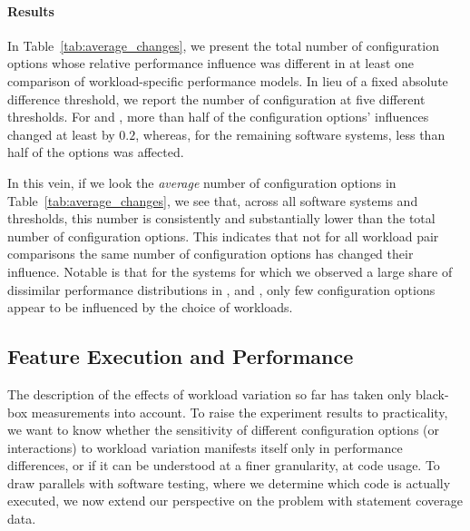 \paragraph*{Results} {\color{blue} 
In Table~\ref{tab:average_changes}, we present the total number of configuration options whose relative performance influence was different in at least one comparison of workload-specific performance models. In lieu of a fixed absolute difference threshold, we report the number of configuration at five different thresholds. For \jumper and \kanzi, more than half of the configuration options' influences changed at least by $0.2$, whereas, for the remaining software systems, less than half of the options was affected.

In this vein, if we look the \textit{average} number of configuration options in Table~\ref{tab:average_changes}, we see that, across all software systems and thresholds, this number is consistently and substantially lower than the total number of configuration options. This indicates that not for all workload pair comparisons the same number of configuration options has changed their influence. Notable is that for the systems for which we observed a large share of dissimilar performance distributions in , \dconvert and \htwo, only few configuration options appear to be influenced by the choice of workloads.

\vspace{1em}

}


\subsection{Feature Execution and Performance}\label{sec:rq3}
The description of the effects of workload variation so far has taken only black-box measurements into account. To raise the experiment results to practicality, we want to know whether the sensitivity of different configuration options (or interactions) to workload variation manifests itself only in performance differences, or if it can be understood at a finer granularity, at code usage. To draw parallels with software testing, where we determine which code is actually executed, we now extend our perspective on the problem with statement coverage data. 

